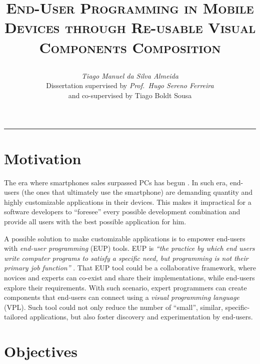 \documentclass[9pt,a4paper]{extarticle}
\begin{document}
\title{\vspace*{-8mm}\textbf{\textsc{End-User Programming in Mobile Devices
through Re-usable Visual Components Composition}}
\author{\emph{Tiago Manuel da Silva Almeida}\\[2mm]
\small{Dissertation supervised by \emph{Prof.\ Hugo Sereno Ferreira}}\\
\small{and co-supervised by Tiago Boldt Sousa}}}
\date{}
\maketitle
\thispagestyle{empty}

\vspace*{-4mm}\noindent\rule{\textwidth}{0.4pt}\vspace*{4mm}

\begin{multicols}{2}

\section{Motivation}\label{sec:motiva}

The era where smartphones sales surpassed PCs has begun \cite{more_smartphones}. In such era, end-users (the ones that ultimately use the smartphone) 
are demanding quantity and highly customizable applications in their devices. 
This makes it impractical for a software developers to ``foresee'' every possible development combination and provide all users with the best possible application for him. 

A possible solution to make customizable applications is to empower end-users with \emph{end-user programming} (EUP) tools. 
EUP is \emph{``the practice by which end users write computer programs to satisfy a specific need, but programming is not their primary job function''} \cite{EUSEReport}.
That EUP tool could be a collaborative framework, where novices and experts can co-exist and share their implementations, while end-users explore their requirements. With such scenario, expert programmers can create components that end-users can connect using a \emph{visual programming language} (VPL). Such tool could not only reduce the number of ``small'', similar, specific-tailored applications, but also foster discovery and experimentation by end-users.

\section{Objectives}\label{sec:goals}


\end{multicols}
\end{document}
